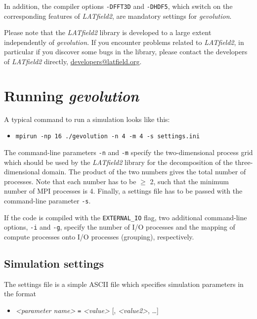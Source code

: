 \documentclass[a4paper,10pt]{article}
\begin{document}
\noindent In addition, the compiler options \texttt{-DFFT3D} and \texttt{-DHDF5}, which switch on the corresponding features of \textit{LATfield2}, are mandatory settings for \textit{gevolution}.

Please note that the \textit{LATfield2} library is developed to a large extent independently of \textit{gevolution}. If you encounter problems related to \textit{LATfield2}, in particular if you discover some bugs in the library, please contact the developers of \textit{LATfield2} directly, \url{developers@latfield.org}.


\section{Running \textit{gevolution}}

A typical command to run a simulation looks like this:

\begin{itemize}
 \item[] \texttt{mpirun -np 16 ./gevolution -n 4 -m 4 -s settings.ini} 
\end{itemize}

\noindent The command-line parameters \texttt{-n} and \texttt{-m} specify the two-dimensional process grid which should be used by the 
\textit{LATfield2} library for the decomposition of the three-dimensional domain. The product of the two numbers gives the total number of 
processes. Note that each number has to be $\geq$ 2, such that the minimum number of MPI processes is 4. Finally, a settings file has to be 
passed with the command-line parameter \texttt{-s}.

If the code is compiled with the \texttt{EXTERNAL\_IO} flag, two additional command-line options, \texttt{-i} and \texttt{-g}, specify the 
number of I/O processes and the mapping of compute processes onto I/O processes (grouping), respectively.

\subsection{Simulation settings}

The settings file is a simple ASCII file which specifies simulation parameters in the format

\begin{itemize}
 \item[] \textit{<parameter name>} \texttt{=} \textit{<value>} [, \textit{<value2>}, \ldots]
\end{itemize}
\end{document}

